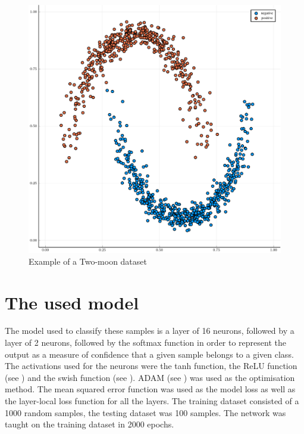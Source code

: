 \begin{figure}
	\centering
	\includegraphics[width=\textwidth]{images/two-moon/two-moon.pdf}
	\caption{Example of a Two-moon dataset}\label{twomoon}
\end{figure}


\section{The used model}

The model used to classify these samples is a layer of 16 neurons, followed by a layer of 2 neurons, followed by the softmax function in order to represent the output as a measure of confidence that a given sample belongs to a given class. The activations used for the neurons were the tanh function, the ReLU function (see \cite{hahnloser_digital_2000}) and the swish function (see \cite{ramachandran_searching_2018}). ADAM (see \cite{kingma_adam:_2014}) was used as the optimisation method. The mean squared error function was used as the model loss as well as the layer-local loss function for all the layers. The training dataset consisted of a 1000 random samples, the testing dataset was 100 samples. The network was taught on the training dataset in 2000 epochs.

